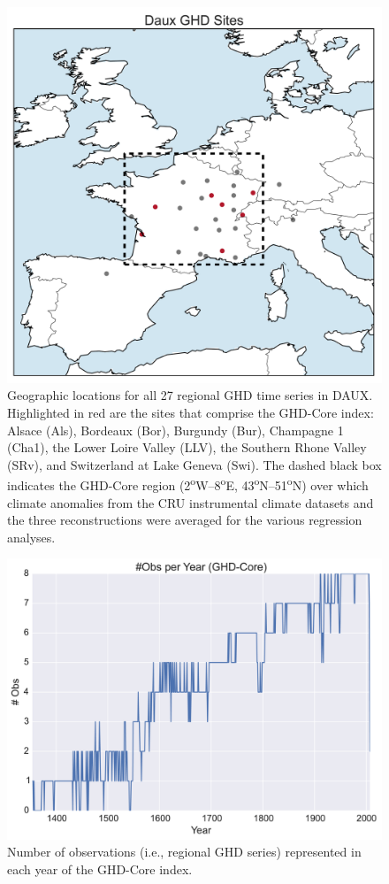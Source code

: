 \documentclass[12pt]{article}
\begin{document}
\begin{figure}
\center
\includegraphics[width=1.0\columnwidth,scale=2]{SUPP_fig_01_map_sitelocs.png}
\caption{Geographic locations for all 27 regional GHD time series in DAUX. Highlighted in red are the sites that comprise the GHD-Core index: Alsace (Als), Bordeaux (Bor), Burgundy (Bur), Champagne 1 (Cha1), the Lower Loire Valley (LLV), the Southern Rhone Valley (SRv), and Switzerland at Lake Geneva (Swi). The dashed black box indicates the GHD-Core region (2\textsuperscript{o}W--8\textsuperscript{o}E, 43\textsuperscript{o}N--51\textsuperscript{o}N) over which climate anomalies from the CRU instrumental climate datasets and the three reconstructions were averaged for the various regression analyses.}
\end{figure}

\begin{figure}
\center
\includegraphics[width=1.0\columnwidth,scale=2]{SUPP_fig_02_numobs.png}
\caption{Number of observations (i.e., regional GHD series) represented in each year of the GHD-Core index.}
\end{figure}
\end{document}
